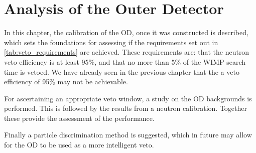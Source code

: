 \chapter{Analysis of the Outer Detector} \label{chap:analysis_of_the_od}

\par
In this chapter, the calibration of the OD, once it was constructed is described, which sets the foundations for assessing if the requirements set out in \autoref{tab:veto_requirements} are achieved.
These requirements are: that the neutron veto efficiency is at least 95\%, and that no more than 5\% of the WIMP search time is vetoed.
We have already seen in the previous chapter that the a veto efficiency of 95\% may not be achievable. 
\par
For ascertaining an appropriate veto window, a study on the OD backgrounds is performed. 
This is followed by the results from a neutron calibration.
Together these provide the assessment of the performance.
\par
Finally a particle discrimination method is suggested, which in future may allow for the OD to be used as a more intelligent veto.








%